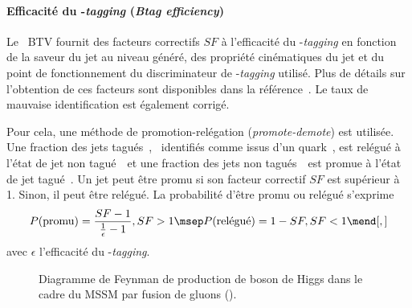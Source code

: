 \paragraph{Efficacité du \quarkb-\emph{tagging} (\emph{Btag efficiency})}
Le \POG\ BTV fournit des facteurs correctifs $SF$ à l'efficacité du \quarkb-\emph{tagging} en fonction de la saveur du jet au niveau généré, des propriété cinématiques du jet et du point de fonctionnement du discriminateur de \quarkb-\emph{tagging} utilisé.
Plus de détails sur l'obtention de ces facteurs sont disponibles dans la référence~\cite{Sirunyan_heavy_flavor_jets_2018}.
Le taux de mauvaise identification est également corrigé.
\par
Pour cela, une méthode de promotion-relégation (\emph{promote-demote}) est utilisée.
Une fraction des jets tagués~\quarkb, \ie\ identifiés comme issus d'un quark~\quarkb, est relégué à l'état de jet non tagué~\quarkb\ et
une fraction des jets non tagués~\quarkb\ est promue à l'état de jet tagué~\quarkb.
Un jet peut être promu si son facteur correctif $SF$ est supérieur à 1.
Sinon, il peut être relégué.
La probabilité d'être promu ou relégué s'exprime
\begin{equation}
P(\text{promu}) = \frac{SF-1}{\frac{1}{\epsilon}-1}, SF > 1
\msep
P(\text{relégué}) = 1 - SF, SF < 1
\mend[,]
\end{equation}
avec $\epsilon$ l'efficacité du \quarkb-\emph{tagging}.
\begin{wrapfigure}{R}{5cm}
\centering
\vspace{\baselineskip}
\caption[Production de boson de Higgs du MSSM par fusion de gluons.]{Diagramme de Feynman de production de boson de Higgs dans le cadre du MSSM par fusion de gluons (\gluon\gluon\Higgs).}
\label{fig-chapter-HTT_analysis-section-corrections-fgraph-gg_loop_hHA}
\end{wrapfigure}
